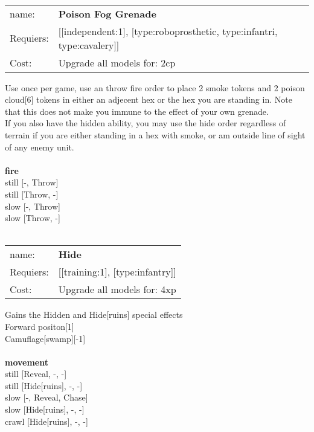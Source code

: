 \ \\
\begin{tabular}{ll}
name: & {\bf Poison Fog Grenade } \\
Requiers: & [[independent:1], [type:roboprosthetic, type:infantri, type:cavalery]] \\
Cost: & Upgrade all models for: 2cp \\
\end{tabular}

Use once per game, use an throw fire order to place 2 smoke tokens and 2 poison cloud[6] tokens in either an adjecent hex or the hex you are standing in. Note that this does not make you immune to the effect of your own grenade.\\ 
If you also have the hidden ability, you may use the hide order regardless of terrain if you are either standing in a hex with smoke, or am outside line of sight of any enemy unit. \\ 








\ \\ {\bf fire } \\
still [-, Throw] \\
still [Throw, -] \\
slow [-, Throw] \\
slow [Throw, -] \\

\ \\
\begin{tabular}{ll}
name: & {\bf Hide } \\
Requiers: & [[training:1], [type:infantry]] \\
Cost: & Upgrade all models for: 4xp \\
\end{tabular}

Gains the Hidden and Hide[ruins] special effects\\ 
Forward positon[1]\\ 
Camuflage[swamp][-1]\\ 








\ \\ {\bf movement } \\
still [Reveal, -, -] \\
still [Hide[ruins], -, -] \\
slow [-, Reveal, Chase] \\
slow [Hide[ruins], -, -] \\
crawl [Hide[ruins], -, -] \\

